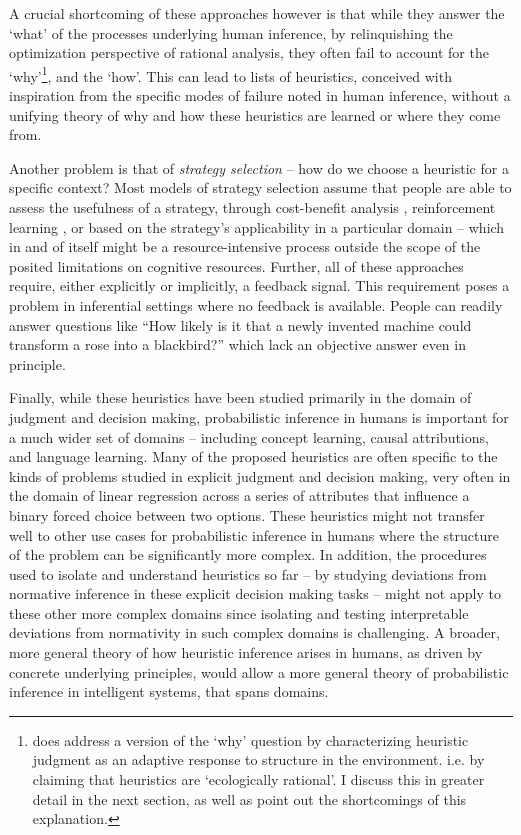 A crucial shortcoming of these approaches however is that while they answer the `what' of the processes underlying human inference, by relinquishing the optimization perspective of rational analysis, they often fail to account for the `why'\footnote{\citet{gigerenzer2008heuristics} does address a version of the `why' question by characterizing heuristic judgment as an adaptive response to structure in the environment. i.e. by claiming that heuristics are `ecologically rational'. I discuss this in greater detail in the next section, as well as point out the shortcomings of this explanation.}, and the `how'. This can lead to lists of heuristics, conceived with inspiration from the specific modes of failure noted in human inference, without a unifying theory of why and how these heuristics are learned or where they come from. 

Another problem is that of \emph{strategy selection} \citep{gigerenzer2008heuristics, marewski2014strategy} -- how do we choose a heuristic for a specific context? Most models of strategy selection assume that people are able to assess the usefulness of a strategy, through cost-benefit analysis \citep{johnson85, beach1978contingency, lieder2017strategy}, reinforcement learning \citep{erev05, rieskamp06}, or based on the strategy's applicability in a particular domain \citep{marewski2011cognitive, schulz2016simple} -- which in and of itself might be a resource-intensive process outside the scope of the posited limitations on cognitive resources. Further, all of these approaches require, either explicitly or implicitly, a feedback signal. This requirement poses a problem in inferential settings where no feedback is available. People can readily answer questions like ``How likely is it that a newly invented machine could transform a rose into a blackbird?'' \citep{Griffiths15} which lack an objective answer even in principle. 

Finally, while these heuristics have been studied primarily in the domain of judgment and decision making, probabilistic inference in humans is important for a much wider set of domains -- including concept learning, causal attributions, and language learning. Many of the proposed heuristics are often specific to the kinds of problems studied in explicit judgment and decision making, very often in the domain of linear regression across a series of attributes that influence a binary forced choice between two options\citep{czerlinski1999good, csimcsek2015learning}. These heuristics might not transfer well to other use cases for probabilistic inference in humans where the structure of the problem can be significantly more complex. In addition, the procedures used to isolate and understand heuristics so far -- by studying deviations from normative inference in these explicit decision making tasks -- might not apply to these other more complex domains since isolating and testing interpretable deviations from normativity in such complex domains is challenging. A broader, more general theory of how heuristic inference arises in humans, as driven by concrete underlying principles, would allow a more general theory of probabilistic inference in intelligent systems, that spans domains.

